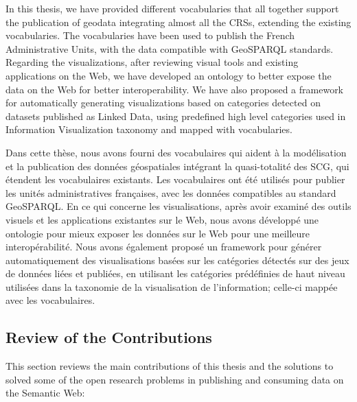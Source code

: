 \documentclass[a4paper,11pt,twoside]{report}
\begin{document}
In this thesis, we have provided different vocabularies that all together support the publication of geodata integrating almost all the CRSs, extending the existing vocabularies. The vocabularies have been used to publish the French Administrative Units, with the data compatible with GeoSPARQL standards. Regarding the visualizations, after reviewing visual tools and existing applications on the Web, we have developed an ontology to better expose the data on the Web for better interoperability. We have also proposed a framework for  automatically generating visualizations based on categories detected on datasets published as Linked Data, using predefined high level categories used in Information Visualization taxonomy and mapped with vocabularies. 

Dans cette thèse, nous avons fourni des vocabulaires qui aident à la modélisation et la publication des données géospatiales intégrant la quasi-totalité des SCG, qui étendent les vocabulaires existants. Les vocabulaires ont été utilisés pour publier les unités administratives françaises, avec les données compatibles au standard GeoSPARQL. En ce qui concerne les visualisations, après avoir examiné des outils visuels et les applications existantes sur le Web, nous avons développé une ontologie pour mieux exposer les données sur le Web pour une meilleure interopérabilité. Nous avons également proposé un framework pour générer automatiquement des visualisations basées sur les catégories détectés sur des jeux de données liées et publiées, en utilisant les catégories prédéfinies de haut niveau  utilisées dans la taxonomie de la visualisation de l'information; celle-ci mappée avec les vocabulaires.





\subsection*{Review of the Contributions}
This section reviews the main contributions of this thesis and the solutions to solved some of the open research problems in publishing and consuming data on the Semantic Web:
\end{document}
